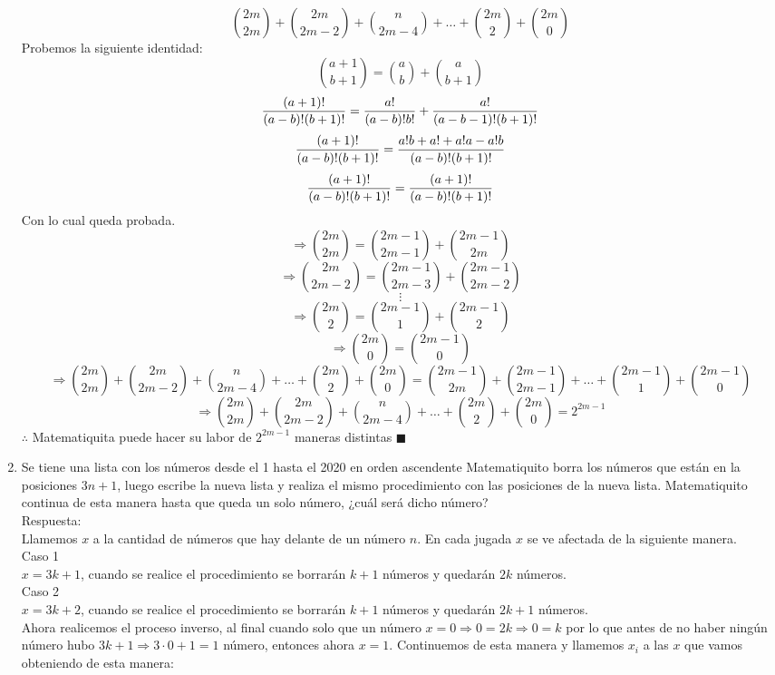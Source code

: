\documentclass{book}
\begin{document}
\begin{enumerate}
        $${2m \choose 2m}+{2m \choose 2m-2}+{n \choose 2m-4}+\ldots+{2m \choose 2}+{2m \choose 0}$$
        Probemos la siguiente identidad:
        $${a+1 \choose b+1}={a \choose b}+{a \choose b+1}$$
        $${(a+1)!\over (a-b)!(b+1)!}={a!\over (a-b)!b!}+{a!\over (a-b-1)!(b+1)!}$$
        $${(a+1)!\over (a-b)!(b+1)!}=\frac{a!b+a!+a!a-a!b}{(a-b)!(b+1)!}$$
        $${(a+1)!\over (a-b)!(b+1)!}={(a+1)!\over (a-b)!(b+1)!}$$
        Con lo cual queda probada.
        $$\Rightarrow {2m \choose 2m}={2m-1 \choose 2m-1}+{2m-1 \choose 2m}$$
        $$\Rightarrow {2m \choose 2m-2}={2m-1 \choose 2m-3}+{2m-1 \choose 2m-2}$$
        $$\vdots$$
        $$\Rightarrow {2m \choose 2}={2m-1 \choose 1}+{2m-1 \choose 2}$$
        $$\Rightarrow{2m \choose 0}={2m-1 \choose 0}$$
        $$\Rightarrow {2m \choose 2m}+{2m \choose 2m-2}+{n \choose 2m-4}+\ldots+{2m \choose 2}+{2m \choose 0}={2m-1 \choose 2m}+{2m-1 \choose 2m-1}+\ldots +{2m-1 \choose 1}+{2m-1 \choose 0}$$
        $$\Rightarrow {2m \choose 2m}+{2m \choose 2m-2}+{n \choose 2m-4}+\ldots+{2m \choose 2}+{2m \choose 0}=2^{2m-1}$$
        $\therefore$ Matematiquita puede hacer su labor de $2^{2m-1}$ maneras distintas $\blacksquare$\\
        \item Se tiene una lista con los números desde el 1 hasta el 2020 en orden ascendente Matematiquito borra los números que están en la posiciones $3n+1$, luego escribe la nueva lista y realiza el mismo procedimiento con las posiciones de la nueva lista. Matematiquito continua de esta manera hasta que queda un solo número, ¿cuál será dicho número?\\
        Respuesta:\\
        Llamemos $x$ a la cantidad de números que hay delante de un número $n$. En cada jugada $x$ se ve afectada de la siguiente manera.\\
        Caso 1\\
        $x=3k+1$, cuando se realice el procedimiento se borrarán $k+1$ números y quedarán $2k$ números.\\
        Caso 2\\
        $x=3k+2$, cuando se realice el procedimiento se borrarán $k+1$ números y quedarán $2k+1$ números.\\
        Ahora realicemos el proceso inverso, al final cuando solo que un número $x=0\Rightarrow 0=2k\Rightarrow 0=k$ por lo que antes de no haber ningún número hubo $3k+1\Rightarrow 3\cdot 0+1=1$ número, entonces ahora $x=1$. Continuemos de esta manera y llamemos $x_i$ a las $x$ que vamos obteniendo de esta manera:

\end{enumerate}
\end{document}
